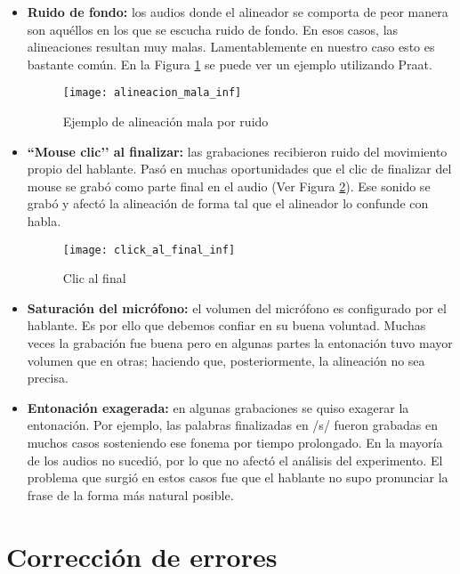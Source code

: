\begin{itemize}
    \item \textbf{Ruido de fondo:} los audios donde el alineador se comporta de peor manera son aquéllos en los que se escucha ruido de fondo. En esos casos, las alineaciones resultan muy malas. Lamentablemente en nuestro caso esto es bastante común. En la Figura \ref{alinMala} se puede ver un ejemplo utilizando Praat.

\begin{figure}[h!]
    \centerline{\texttt{[image: alineacion\_mala\_inf]} }
    \caption{Ejemplo de alineación mala por ruido}
    \label{alinMala}
\end{figure}

    \item \textbf{``Mouse clic’’ al finalizar:} las grabaciones recibieron ruido del movimiento propio del hablante. Pasó en muchas oportunidades que el clic de finalizar del mouse se grabó como parte final en el audio (Ver Figura \ref{clickFinal}). Ese sonido se grabó y afectó la alineación de forma tal que el alineador lo confunde con habla.
    
\begin{figure}[h!]
    \centerline{\texttt{[image: click\_al\_final\_inf]} }
    \caption{Clic al final}
    \label{clickFinal}
\end{figure}

    \item \textbf{Saturación del micrófono:} el volumen del micrófono es configurado por el hablante. Es por ello que debemos confiar en su buena voluntad. Muchas veces la grabación fue buena pero en algunas partes la entonación tuvo mayor volumen que en otras; haciendo que, posteriormente, la alineación no sea precisa.
    
    \item \textbf{Entonación exagerada:} en algunas grabaciones se quiso exagerar la entonación. Por ejemplo, las palabras finalizadas en /s/ fueron grabadas en muchos casos sosteniendo ese fonema por tiempo prolongado. En la mayoría de los audios no sucedió, por lo que no afectó el análisis del experimento. El problema que surgió en estos casos fue que el hablante no supo pronunciar la frase de la forma más natural posible. 
    
\end{itemize}

\section{Corrección de errores}

